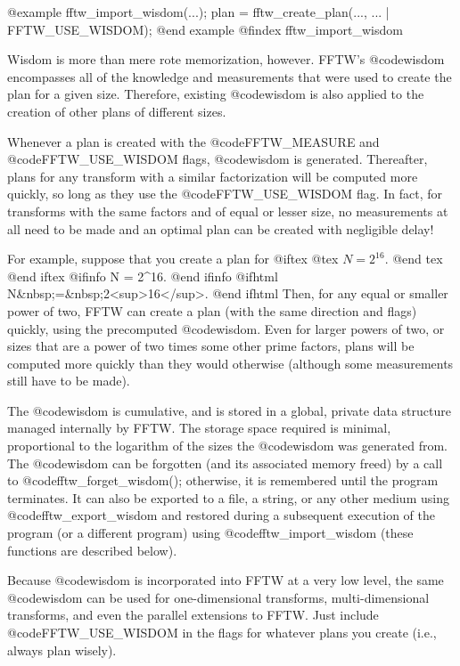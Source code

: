 @example
     fftw_import_wisdom(...);
     plan = fftw_create_plan(..., ... | FFTW_USE_WISDOM);
@end example
@findex fftw_import_wisdom

Wisdom is more than mere rote memorization, however.  FFTW's
@code{wisdom} encompasses all of the knowledge and measurements that
were used to create the plan for a given size.  Therefore, existing
@code{wisdom} is also applied to the creation of other plans of
different sizes.

Whenever a plan is created with the @code{FFTW_MEASURE} and
@code{FFTW_USE_WISDOM} flags, @code{wisdom} is generated.  Thereafter,
plans for any transform with a similar factorization will be computed
more quickly, so long as they use the @code{FFTW_USE_WISDOM} flag.  In
fact, for transforms with the same factors and of equal or lesser size,
no measurements at all need to be made and an optimal plan can be
created with negligible delay!

For example, suppose that you create a plan for
@iftex
@tex
$N = 2^{16}$.
@end tex
@end iftex
@ifinfo
N = 2^16.
@end ifinfo
@ifhtml
N&nbsp;=&nbsp;2<sup>16</sup>.
@end ifhtml
Then, for any equal or smaller power of two, FFTW can create a
plan (with the same direction and flags) quickly, using the
precomputed @code{wisdom}. Even for larger powers of two, or sizes that
are a power of two times some other prime factors, plans will be
computed more quickly than they would otherwise (although some
measurements still have to be made).

The @code{wisdom} is cumulative, and is stored in a global, private data
structure managed internally by FFTW.  The storage space required is
minimal, proportional to the logarithm of the sizes the @code{wisdom} was
generated from.  The @code{wisdom} can be forgotten (and its associated
memory freed) by a call to @code{fftw_forget_wisdom()}; otherwise, it is
remembered until the program terminates.  It can also be exported to a
file, a string, or any other medium using @code{fftw_export_wisdom} and
restored during a subsequent execution of the program (or a different
program) using @code{fftw_import_wisdom} (these functions are described
below).

Because @code{wisdom} is incorporated into FFTW at a very low level, the
same @code{wisdom} can be used for one-dimensional transforms,
multi-dimensional transforms, and even the parallel extensions to FFTW.
Just include @code{FFTW_USE_WISDOM} in the flags for whatever plans you
create (i.e., always plan wisely).

